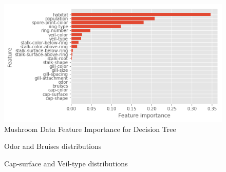 \documentclass[10pt, conference, compsocconf]{IEEEtran}
\begin{document}
\begin{figure}[h]
	\includegraphics[scale = 0.4]{image/mushroomFullFeature_important.png}
	\caption{Mushroom Data Feature Importance for Decision Tree}
	\label{fig:mushroomimportance}
\end{figure}

\begin{figure}[h]
	\hfill
	\centering
	\hfill
	\hfill
	\caption{Odor and Bruises distributions}
	\label{fig:1}
	
\end{figure}

\begin{figure}[h]
	\hfill
	\centering
	\hfill
	\hfill
	\caption{Cap-surface and Veil-type distributions}
	\label{fig:2}
	
\end{figure}
 
\end{document}
